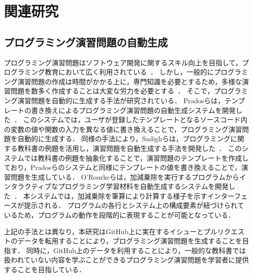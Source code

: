 \chapter{関連研究}
\graphicspath{{Chapter2/Figs/}}

%
%
\section{プログラミング演習問題の自動生成}
プログラミング演習問題はソフトウェア開発に関するスキル向上を目指して，プログラミング教育において広く利用されている~\cite{felder1988learning}．
しかし，一般的にプログラミング演習問題の作成は時間がかかる上に，専門知識を必要とするため，多様な演習問題を数多く作成することは大変な労力を必要とする~\cite{Algorithm_Visualization_in_CS_Education,Guo_Codeopticon}．
そこで，プログラミング演習問題を自動的に生成する手法が研究されている．
Pradosらは，テンプレートの書き換えによるプログラミング演習問題の自動生成システムを開発した~\cite{prados_automatic_exercise_generation}．
このシステムでは，ユーザが登録したテンプレートとなるソースコード内の変数の値や関数の入力を異なる値に書き換えることで，プログラミング演習問題を自動的に生成する．
同様の手法により，Sadighらは，プログラミングに関する教科書の例題を活用し，演習問題を自動生成する手法を開発した~\cite{Sadigh_automatic_exercise_generation}．
このシステムでは教科書の例題を抽象化することで，演習問題のテンプレートを作成しており，Pradosらのシステムと同様にテンプレートの値を書き換えることで，演習問題を生成している．
O'Rourkeらは，加減乗除を実行するプログラムからインタラクティブなプログラミング学習材料を自動生成するシステムを開発した~\cite{O'Rourke_Scaffolding_CHI15}．
本システムでは，加減乗除を筆算により計算する様子を示すインターフェースが提示される．
プログラムの各行とシステム上の構成要素が紐づけられているため，プログラムの動作を段階的に表現することが可能となっている．

上記の手法とは異なり，本研究はGitHub上に実在するイシューとプルリクエストのデータを転用することにより，プログラミング演習問題を生成することを目指す．
同時に，GitHub上のデータを利用することにより，一般的な教科書では扱われていない内容を学ぶことができるプログラミング演習問題を学習者に提供することを目指している．

